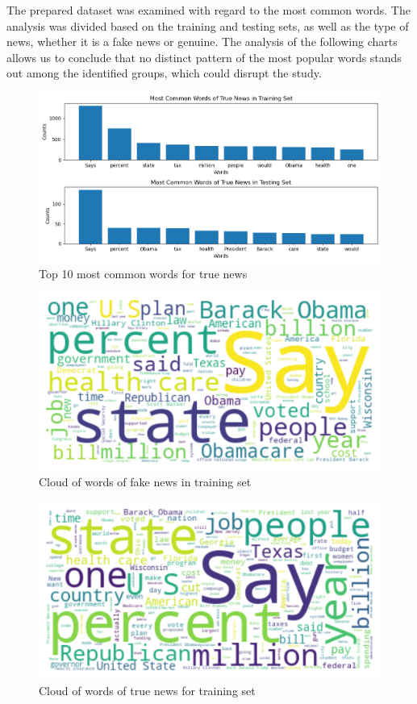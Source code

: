 The prepared dataset was examined with regard to the most common words. The analysis was divided based on the training and testing sets, as well as the type of news, whether it is a fake news or genuine. The analysis of the following charts allows us to conclude that no distinct pattern of the most popular words stands out among the identified groups, which could disrupt the study.

\begin{figure}[!htbp]
\centering
\includegraphics[width=0.7\linewidth]{top10_common_words_true.png}
\caption{Top 10 most common words for true news}
\label{top10_common_words_true}
\end{figure}

\begin{figure}[!htbp]
\centering
\includegraphics[width=0.7\linewidth]{wordcloud_train_fake.png}
\caption{Cloud of words of fake news in training set}
\label{wordcloud_train_fake}
\end{figure}

\begin{figure}[!htbp]
\centering
\includegraphics[width=0.7\linewidth]{wordcloud_train_true.png}
\caption{Cloud of words of true news for training set}
\label{wordcloud_train_true}
\end{figure}

